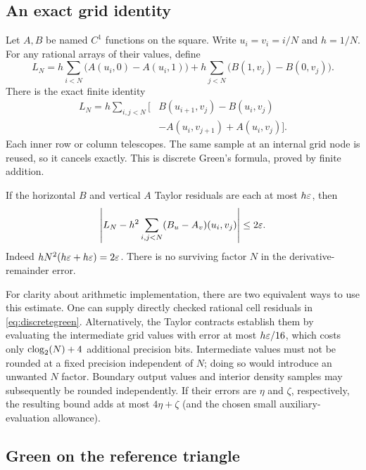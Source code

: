 \subsection{An exact grid identity}

Let $A,B$ be named $C^1$ functions on the square. Write $u_i=v_i=i/N$ and $h=1/N$. For any rational arrays of their values, define
\[
L_N=h\sum_{i<N}\bigl(A(u_i,0)-A(u_i,1)\bigr)
+h\sum_{j<N}\bigl(B(1,v_j)-B(0,v_j)\bigr).
\]
There is the exact finite identity
\begin{equation}\label{eq:discretegreen}
\begin{split}
L_N=h\sum_{i,j<N}\bigl[&B(u_{i+1},v_j)-B(u_i,v_j)\\
&-A(u_i,v_{j+1})+A(u_i,v_j)\bigr].
\end{split}
\end{equation}
Each inner row or column telescopes. The same sample at an internal grid node is reused, so it cancels exactly. This is discrete Green's formula, proved by finite addition.

If the horizontal $B$ and vertical $A$ Taylor residuals are each at most $h\varepsilon$, then
\begin{equation}\label{eq:greenerror}
\left|L_N-h^2\sum_{i,j<N}(B_u-A_v)(u_i,v_j)\right|\le2\varepsilon.
\end{equation}
Indeed $hN^2(h\varepsilon+h\varepsilon)=2\varepsilon$. There is no surviving factor $N$ in the derivative-remainder error.

For clarity about arithmetic implementation, there are two equivalent ways to use this estimate. One can supply directly checked rational cell residuals in \eqref{eq:discretegreen}. Alternatively, the Taylor contracts establish them by evaluating the intermediate grid values with error at most $h\varepsilon/16$, which costs only $\operatorname{clog}_2(N)+4$ additional precision bits. Intermediate values must not be rounded at a fixed precision independent of $N$; doing so would introduce an unwanted $N$ factor. Boundary output values and interior density samples may subsequently be rounded independently. If their errors are $\eta$ and $\zeta$, respectively, the resulting bound adds at most $4\eta+\zeta$ (and the chosen small auxiliary-evaluation allowance).

\subsection{Green on the reference triangle}\label{sec:green}

